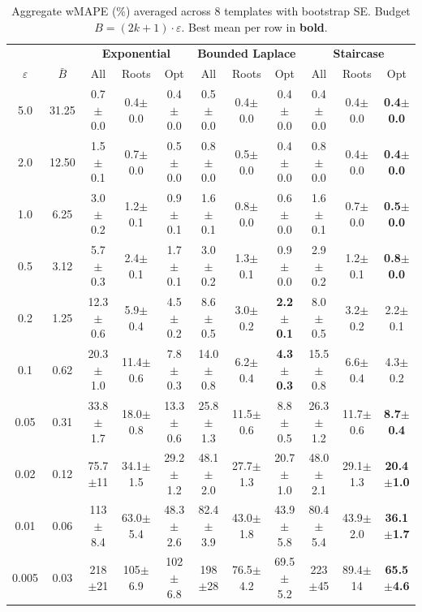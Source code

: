 \providecommand{\pmstd}[1]{{\scriptsize $\pm$#1}}

\begin{table}[t]
\centering
\setlength{\tabcolsep}{2.8pt}
\small
\caption{Aggregate wMAPE (\%) averaged across 8 templates with bootstrap SE. Budget $B = (2k+1) \cdot \varepsilon$. Best mean per row in \textbf{bold}.}
\label{tab:rq1_2kplus1_wmape}
\begin{tabular}{cc|ccc|ccc|ccc}
\toprule
& & \multicolumn{3}{c|}{\textbf{Exponential}} & \multicolumn{3}{c|}{\textbf{Bounded Laplace}} & \multicolumn{3}{c}{\textbf{Staircase}} \\
$\varepsilon$ & $\bar{B}$ & All & Roots & Opt & All & Roots & Opt & All & Roots & Opt \\
\midrule
5.0 & 31.25 & 0.7\pmstd{0.0} & 0.4\pmstd{0.0} & 0.4\pmstd{0.0} & 0.5\pmstd{0.0} & 0.4\pmstd{0.0} & 0.4\pmstd{0.0} & 0.4\pmstd{0.0} & 0.4\pmstd{0.0} & \textbf{0.4\pmstd{0.0}} \\
2.0 & 12.50 & 1.5\pmstd{0.1} & 0.7\pmstd{0.0} & 0.5\pmstd{0.0} & 0.8\pmstd{0.0} & 0.5\pmstd{0.0} & 0.4\pmstd{0.0} & 0.8\pmstd{0.0} & 0.4\pmstd{0.0} & \textbf{0.4\pmstd{0.0}} \\
1.0 & 6.25 & 3.0\pmstd{0.2} & 1.2\pmstd{0.1} & 0.9\pmstd{0.1} & 1.6\pmstd{0.1} & 0.8\pmstd{0.0} & 0.6\pmstd{0.0} & 1.6\pmstd{0.1} & 0.7\pmstd{0.0} & \textbf{0.5\pmstd{0.0}} \\
0.5 & 3.12 & 5.7\pmstd{0.3} & 2.4\pmstd{0.1} & 1.7\pmstd{0.1} & 3.0\pmstd{0.2} & 1.3\pmstd{0.1} & 0.9\pmstd{0.0} & 2.9\pmstd{0.2} & 1.2\pmstd{0.1} & \textbf{0.8\pmstd{0.0}} \\
0.2 & 1.25 & 12.3\pmstd{0.6} & 5.9\pmstd{0.4} & 4.5\pmstd{0.2} & 8.6\pmstd{0.5} & 3.0\pmstd{0.2} & \textbf{2.2\pmstd{0.1}} & 8.0\pmstd{0.5} & 3.2\pmstd{0.2} & 2.2\pmstd{0.1} \\
0.1 & 0.62 & 20.3\pmstd{1.0} & 11.4\pmstd{0.6} & 7.8\pmstd{0.3} & 14.0\pmstd{0.8} & 6.2\pmstd{0.4} & \textbf{4.3\pmstd{0.3}} & 15.5\pmstd{0.8} & 6.6\pmstd{0.4} & 4.3\pmstd{0.2} \\
0.05 & 0.31 & 33.8\pmstd{1.7} & 18.0\pmstd{0.8} & 13.3\pmstd{0.6} & 25.8\pmstd{1.3} & 11.5\pmstd{0.6} & 8.8\pmstd{0.5} & 26.3\pmstd{1.2} & 11.7\pmstd{0.6} & \textbf{8.7\pmstd{0.4}} \\
0.02 & 0.12 & 75.7\pmstd{11} & 34.1\pmstd{1.5} & 29.2\pmstd{1.2} & 48.1\pmstd{2.0} & 27.7\pmstd{1.3} & 20.7\pmstd{1.0} & 48.0\pmstd{2.1} & 29.1\pmstd{1.3} & \textbf{20.4\pmstd{1.0}} \\
0.01 & 0.06 & 113\pmstd{8.4} & 63.0\pmstd{5.4} & 48.3\pmstd{2.6} & 82.4\pmstd{3.9} & 43.0\pmstd{1.8} & 43.9\pmstd{5.8} & 80.4\pmstd{5.4} & 43.9\pmstd{2.0} & \textbf{36.1\pmstd{1.7}} \\
0.005 & 0.03 & 218\pmstd{21} & 105\pmstd{6.9} & 102\pmstd{6.8} & 198\pmstd{28} & 76.5\pmstd{4.2} & 69.5\pmstd{5.2} & 223\pmstd{45} & 89.4\pmstd{14} & \textbf{65.5\pmstd{4.6}} \\
\bottomrule
\end{tabular}
\end{table}
